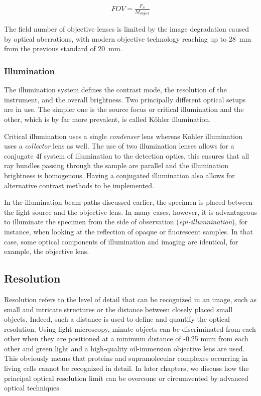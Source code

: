 \begin{align}
FOV = \frac{F_{n}}{M_{\text{object}}}
\end{align}

The field number of objective lenses is limited by the image degradation caused by optical aberrations, with modern objective technology reaching up to \SI{28}{\milli\meter} from the previous standard of \SI{20}{\milli\meter}.

\subsubsection{Illumination}

The illumination system defines the contrast mode, the resolution of the instrument, and the overall brightness.
Two principally different optical setups are in use.
The simpler one is the source focus or critical illumination and the other, which is by far more prevalent, is called Köhler illumination.

Critical illumination uses a single \emph{condenser} lens whereas Kohler illumination uses a \emph{collector} lens as well.
The use of two illumination lenses allows for a conjugate 4f system of illumination to the detection optics, this ensures that all ray bundles passing through the sample are parallel and the illumination brightness is homogenous.
Having a conjugated illumination also allows for alternative contrast methods to be implemented. %

In the illumination beam paths discussed earlier, the specimen is placed between the light source and the objective lens.
In many cases, however, it is advantageous to illuminate the specimen from the side of observation (\emph{epi-illumnination}), for instance, when looking at the reflection of opaque or fluorescent samples.
In that case, some optical components of illumination and imaging are identical, for example, the objective lens. %


\subsection{Resolution}


Resolution refers to the level of detail that can be recognized in an image, such as small and intricate structures or the distance between closely placed small objects.
Indeed, such a distance is used to define and quantify the optical resolution.
Using light microscopy, minute objects can be discriminated from each other when they are positioned at a minimum distance of -0.25 mum from each other and green light and a high-quality oil-immersion objective lens are used.
This obviously means that proteins and supramolecular complexes occurring in living cells cannot be recognized in detail.
In later chapters, we discuss how the principal optical resolution limit can be overcome or circumvented by advanced optical techniques.

